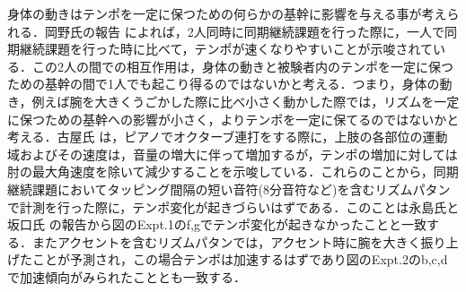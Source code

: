 \documentclass[twocolumn,10pt]{jarticle}
\begin{document}
身体の動きはテンポを一定に保つための何らかの基幹に影響を与える事が考えられる．岡野氏の報告 \cite{Okano}によれば，2人同時に同期継続課題を行った際に，一人で同期継続課題を行った時に比べて，テンポが速くなりやすいことが示唆されている．この2人の間での相互作用は，身体の動きと被験者内のテンポを一定に保つための基幹の間で1人でも起こり得るのではないかと考える．つまり，身体の動き，例えば腕を大きくうごかした際に比べ小さく動かした際では，リズムを一定に保つための基幹への影響が小さく，よりテンポを一定に保てるのではないかと考える．古屋氏 \cite{Huruya}は，ピアノでオクターブ連打をする際に，上肢の各部位の運動域およびその速度は，音量の増大に伴って増加するが，テンポの増加に対しては肘の最大角速度を除いて減少することを示唆している．これらのことから，同期継続課題においてタッピング間隔の短い音符(8分音符など)を含むリズムパタンで計測を行った際に，テンポ変化が起きづらいはずである．このことは永島氏と坂口氏 \cite{Nagasima}の報告から図\label{Nagasima}のExpt.1のf,gでテンポ変化が起きなかったことと一致する．またアクセントを含むリズムパタンでは，アクセント時に腕を大きく振り上げたことが予測され，この場合テンポは加速するはずであり図\label{Nagasima}のExpt.2のb,c,dで加速傾向がみられたこととも一致する．
\end{document}
